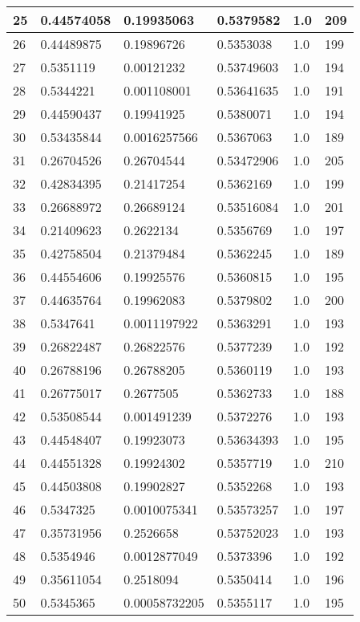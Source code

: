 \begin{longtable}{|l|l|l|l|l|l|}
25 & 0.44574058 & 0.19935063 & 0.5379582 & 1.0 & 209 \\ \hline 
26 & 0.44489875 & 0.19896726 & 0.5353038 & 1.0 & 199 \\ \hline 
27 & 0.5351119 & 0.00121232 & 0.53749603 & 1.0 & 194 \\ \hline 
28 & 0.5344221 & 0.001108001 & 0.53641635 & 1.0 & 191 \\ \hline 
29 & 0.44590437 & 0.19941925 & 0.5380071 & 1.0 & 194 \\ \hline 
30 & 0.53435844 & 0.0016257566 & 0.5367063 & 1.0 & 189 \\ \hline 
31 & 0.26704526 & 0.26704544 & 0.53472906 & 1.0 & 205 \\ \hline 
32 & 0.42834395 & 0.21417254 & 0.5362169 & 1.0 & 199 \\ \hline 
33 & 0.26688972 & 0.26689124 & 0.53516084 & 1.0 & 201 \\ \hline 
34 & 0.21409623 & 0.2622134 & 0.5356769 & 1.0 & 197 \\ \hline 
35 & 0.42758504 & 0.21379484 & 0.5362245 & 1.0 & 189 \\ \hline 
36 & 0.44554606 & 0.19925576 & 0.5360815 & 1.0 & 195 \\ \hline 
37 & 0.44635764 & 0.19962083 & 0.5379802 & 1.0 & 200 \\ \hline 
38 & 0.5347641 & 0.0011197922 & 0.5363291 & 1.0 & 193 \\ \hline 
39 & 0.26822487 & 0.26822576 & 0.5377239 & 1.0 & 192 \\ \hline 
40 & 0.26788196 & 0.26788205 & 0.5360119 & 1.0 & 193 \\ \hline 
41 & 0.26775017 & 0.2677505 & 0.5362733 & 1.0 & 188 \\ \hline 
42 & 0.53508544 & 0.001491239 & 0.5372276 & 1.0 & 193 \\ \hline 
43 & 0.44548407 & 0.19923073 & 0.53634393 & 1.0 & 195 \\ \hline 
44 & 0.44551328 & 0.19924302 & 0.5357719 & 1.0 & 210 \\ \hline 
45 & 0.44503808 & 0.19902827 & 0.5352268 & 1.0 & 193 \\ \hline 
46 & 0.5347325 & 0.0010075341 & 0.53573257 & 1.0 & 197 \\ \hline 
47 & 0.35731956 & 0.2526658 & 0.53752023 & 1.0 & 193 \\ \hline 
48 & 0.5354946 & 0.0012877049 & 0.5373396 & 1.0 & 192 \\ \hline 
49 & 0.35611054 & 0.2518094 & 0.5350414 & 1.0 & 196 \\ \hline 
50 & 0.5345365 & 0.00058732205 & 0.5355117 & 1.0 & 195 \\ \hline 
\end{longtable}
